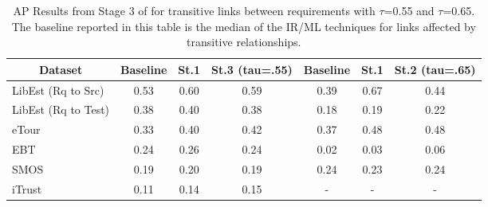 \begin{table}[h]
	\footnotesize
	\centering
	\caption{\footnotesize AP Results from Stage 3 of \Comet for transitive links between requirements with $\tau$=0.55 and $\tau$=0.65. The baseline reported in this table is the median of the IR/ML techniques for links affected by transitive relationships.}
	\label{tab:stage3-results}
	\setlength{\tabcolsep}{0.1em}
	
\begin{tabular}{@{}l|c|c|c|c|c|c@{}}
\toprule
\multicolumn{1}{c|}{\textbf{Dataset}} & \textbf{Baseline} & \textbf{St.1} & \textbf{St.3 (tau=.55)} & \textbf{Baseline} & \textbf{St.1} & \textbf{St.2 (tau=.65)} \\ \midrule
LibEst (Rq to Src)  & 0.53 & 0.60 & 0.59 & 0.39 & 0.67 & 0.44 \\
LibEst (Rq to Test) & 0.38 & 0.40 & 0.38 & 0.18 & 0.19 & 0.22 \\
eTour               & 0.33 & 0.40 & 0.42 & 0.37 & 0.48 & 0.48 \\
EBT                 & 0.24 & 0.26 & 0.24 & 0.02 & 0.03 & 0.06 \\
SMOS                & 0.19 & 0.20 & 0.19 & 0.24 & 0.23 & 0.24 \\
iTrust              & 0.11 & 0.14 & 0.15 & -    & -    & -    \\ \bottomrule
\end{tabular}

\end{table}